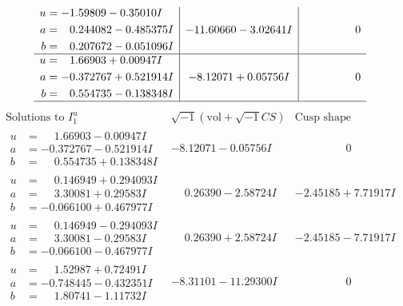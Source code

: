 \documentclass[1p]{elsarticle_modified}
\theoremstyle{definition}
\newcommand{\I}{\sqrt{-1}}
\begin{document}
$$\begin{array}{c|c|c}
\begin{aligned}
u &= -1.59809 - 0.35010 I \\
a &= \phantom{-}0.244082 - 0.485375 I \\
b &= \phantom{-}0.207672 - 0.051096 I\end{aligned}
 & -11.60660 - 3.02641 I & \phantom{-0.000000 } 0 \\ \hline\begin{aligned}
u &= \phantom{-}1.66903 + 0.00947 I \\
a &= -0.372767 + 0.521914 I \\
b &= \phantom{-}0.554735 - 0.138348 I\end{aligned}
 & -8.12071 + 0.05756 I & \phantom{-0.000000 } 0\\
 \hline 
 \end{array}$$\newpage$$\begin{array}{c|c|c}  
\text{Solutions to }I^u_{1}& \I (\text{vol} + \sqrt{-1}CS) & \text{Cusp shape}\\
 \hline 
\begin{aligned}
u &= \phantom{-}1.66903 - 0.00947 I \\
a &= -0.372767 - 0.521914 I \\
b &= \phantom{-}0.554735 + 0.138348 I\end{aligned}
 & -8.12071 - 0.05756 I & \phantom{-0.000000 } 0 \\ \hline\begin{aligned}
u &= \phantom{-}0.146949 + 0.294093 I \\
a &= \phantom{-}3.30081 + 0.29583 I \\
b &= -0.066100 + 0.467977 I\end{aligned}
 & \phantom{-}0.26390 - 2.58724 I & -2.45185 + 7.71917 I \\ \hline\begin{aligned}
u &= \phantom{-}0.146949 - 0.294093 I \\
a &= \phantom{-}3.30081 - 0.29583 I \\
b &= -0.066100 - 0.467977 I\end{aligned}
 & \phantom{-}0.26390 + 2.58724 I & -2.45185 - 7.71917 I \\ \hline\begin{aligned}
u &= \phantom{-}1.52987 + 0.72491 I \\
a &= -0.748445 - 0.432351 I \\
b &= \phantom{-}1.80741 - 1.11732 I\end{aligned}
 & -8.31101 - 11.29300 I & \phantom{-0.000000 } 0 \\ \hline\begin{aligned}

\end{aligned}
\end{array}$$
\end{document}

